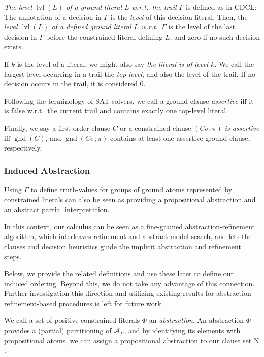 \documentclass[a4paper]{article}
\newcommand{\mGnd}{\operatorname{gnd}} \newcommand{\mLVar}{\operatorname{lvar}} \newcommand{\mRVar}{\operatorname{rvar}} \newcommand{\mDmn}{\operatorname{dom}} \newcommand{\mRng}{\operatorname{rng}} \newcommand{\mMGU}{\operatorname{mgu}} \newcommand{\mDef}{\operatorname{def}} \newcommand{\mDomain}{\mathcal{D}} \newcommand{\mVar}{\operatorname{var}}
\begin{document}
\emph{The level $\operatorname{lvl}(L)$ of a ground literal $L$ w.r.t.\
the trail $\Gamma$} is defined as in CDCL: 
The annotation of a decision in $\Gamma$ is the \emph{level} of this decision literal.
Then, the \emph{level $\operatorname{lvl}(L)$ of a defined ground literal $L$ w.r.t.\
$\Gamma$} is the level of the last decision in $\Gamma$ before the constrained literal defining $L$, and 
zero if no such decision exists.

If $k$ is the level of a literal, we might also say \emph{the literal is of level $k$}.
We call the largest level occurring in a trail the \emph{top-level}, and also the level of the trail. 
If no decision occurs in the trail, it is considered $0$.

Following the terminology of SAT solvers, we call a ground clause \emph{assertive} iff it is false w.r.t.\
the current trail and contains exactly one top-level literal.

Finally, we say a first-order clause $C$ or a constrained clause $(C\sigma; \pi)$ \emph{is assertive} iff $\mGnd(C)$, and $\mGnd(C\sigma; \pi)$ contains 
at least one assertive ground clause, respectively.

\subsubsection*{Induced Abstraction}
Using $\Gamma$ to define truth-values for groups of ground atoms represented by constrained literals can also be seen as providing a propositional 
abstraction and an abstract partial interpretation. 

In this context, our calculus can be seen as a fine-grained abstraction-refinement algorithm, which interleaves refinement and abstract model search, 
and lets the clauses and decision heuristics guide the implicit abstraction and refinement steps. 

Below, we provide the related definitions and use these later to define our induced ordering.
Beyond this, we do not take any advantage of this connection. Further investigation this direction and 
utilizing existing results for abstraction-refinement-based procedures is left for future work.

We call a set of positive constrained literals $\Phi$ an \emph{abstraction}. 
An abstraction $\Phi$ provides a (partial) partitioning of $\mathcal{A}_{\Sigma}$, 
and by identifying its elements with propositional atoms, we can assign a propositional abstraction to our clause set $\text{N}$.
\end{document}
